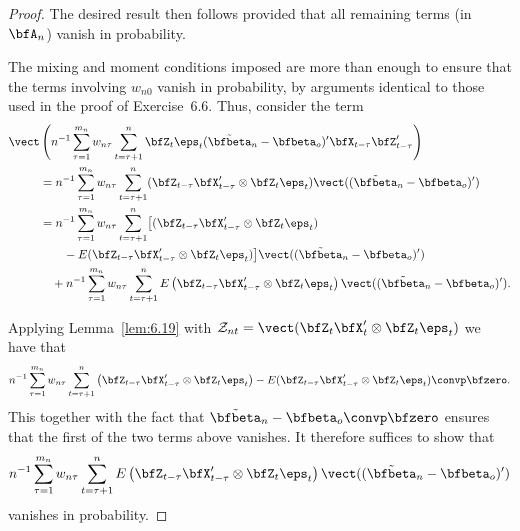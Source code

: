 \begin{proof}
The desired result then follows provided that all remaining terms (in $\bfA_n$) vanish in probability.

The mixing and moment conditions imposed are more than enough to ensure that the terms involving $w_{n0}$ vanish in probability, by arguments identical to those used in the proof of Exercise~6.6. Thus, consider the term
\begin{align*}
  \vect&\left(n^{-1}\sum_{\tau=1}^{m_n}w_{n\tau}\sum_{t=\tau+1}^{n}\bfZ_t\eps_t(\tilde{\bfbeta}_n - \bfbeta_o)'\bfX_{t-\tau}\bfZ_{t-\tau}'\right) \\
  &= n^{-1}\sum_{\tau=1}^{m_n}w_{n\tau}\sum_{t=\tau+1}^{n}(\bfZ_{t-\tau}\bfX_{t-\tau}'\otimes\bfZ_t\eps_t)\vect((\tilde{\bfbeta}_n - \bfbeta_o)') \\
  &= n^{-1}\sum_{\tau=1}^{m_n}w_{n\tau}\sum_{t=\tau+1}^{n}\bigl[(\bfZ_{t-\tau}\bfX_{t-\tau}'\otimes\bfZ_t\eps_t) \\
  &\qquad - E(\bfZ_{t-\tau}\bfX_{t-\tau}'\otimes\bfZ_t\eps_t)\bigr]\vect((\tilde{\bfbeta}_n - \bfbeta_o)') \\
  &\quad + n^{-1}\sum_{\tau=1}^{m_n}w_{n\tau}\sum_{t=\tau+1}^{n}E\left(\bfZ_{t-\tau}\bfX_{t-\tau}'\otimes\bfZ_t\eps_t\right)\vect((\tilde{\bfbeta}_n - \bfbeta_o)').
\end{align*}

Applying Lemma~\ref{lem:6.19} with $\mathcal{Z}_{nt} = \vect(\bfZ_t\bfX_t'\otimes\bfZ_t\eps_t)$ we have that
\[
  n^{-1}\sum_{\tau=1}^{m_n}w_{n\tau}\sum_{t=\tau+1}^{n}\left(\bfZ_{t-\tau}\bfX_{t-\tau}'\otimes\bfZ_t\eps_t\right) - E(\bfZ_{t-\tau}\bfX_{t-\tau}'\otimes\bfZ_t\eps_t) \convp \bfzero.
\]
This together with the fact that $\tilde{\bfbeta}_n - \bfbeta_o \convp \bfzero$ ensures that the first of the two terms above vanishes. It therefore suffices to show that
\[
  n^{-1}\sum_{\tau=1}^{m_n}w_{n\tau}\sum_{t=\tau+1}^{n}E\left(\bfZ_{t-\tau}\bfX_{t-\tau}'\otimes\bfZ_t\eps_t\right)\vect((\tilde{\bfbeta}_n - \bfbeta_o)')
\]
vanishes in probability.


\end{proof}
